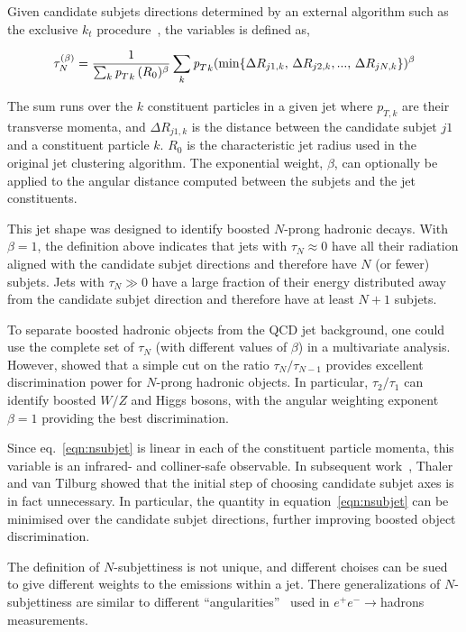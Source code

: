 Given candidate subjets directions determined by an external algorithm such as the exclusive $k_t$ procedure~\cite{exclusivekt}, the variables is defined as,


\begin{equation} 
\tau^{(\beta)}_N = \frac{1}{\sum_k {{\emph{p}_{T}}}_k\,(R_0)^{\beta}} \sum_k {{\emph{p}_{T}}}_k (\min \{ \Delta R_{j1,k},\,\Delta R_{j2,k},...,\,\Delta R_{jN,k} \})^{\beta}
\label{eqn:nsubjet}
\end{equation} 

The sum runs over the $k$ constituent particles in a given jet where $p_{T,k}$ are their transverse momenta, and $\Delta R_{j1,k}$ is the distance between the candidate subjet $j1$ and a constituent particle $k$.  $R_0$ is the characteristic jet radius used in the original jet clustering algorithm.
The exponential weight, $\beta$, can optionally be applied to the angular distance computed between the subjets and the jet constituents.  

This jet shape was designed to identify boosted $N$-prong hadronic decays. With $\beta=1$, the definition above indicates that jets with $\tau_N\approx 0$ have all their radiation aligned with the candidate subjet directions and therefore have $N$ (or fewer) subjets. Jets with $\tau_N\gg 0$ have a large fraction of their energy distributed away from the candidate subjet direction and therefore have at least $N+1$ subjets.

To separate boosted hadronic objects from the QCD jet background, one could use the complete set of  $\tau_N$ (with different values of $\beta$) in a multivariate analysis. However, \cite{nsubjettiness} showed that a simple cut on the ratio $\tau_N/\tau_{N-1}$ provides excellent discrimination power for $N$-prong hadronic objects. In particular, $\tau_2/\tau_1$ can identify boosted $W/Z$ and Higgs bosons, with the angular weighting exponent $\beta =1$ providing the best discrimination.

Since eq.~\ref{eqn:nsubjet} is linear in each of the constituent particle momenta, this variable is an infrared- and colliner-safe observable.  In subsequent work~\cite{mininsubjettiness}, Thaler and van Tilburg showed that the initial step of choosing candidate subjet axes is in fact unnecessary. In particular, the quantity in equation~\ref{eqn:nsubjet} can be minimised over the candidate subjet directions, further improving boosted object discrimination.

The definition of $N$-subjettiness is not unique, and different choises can be sued to give different weights to the emissions within a jet. There generalizations of $N$-subjettiness are similar to different ``angularities''~\cite{angularities} used in $e^+e^- \rightarrow$hadrons measurements.




